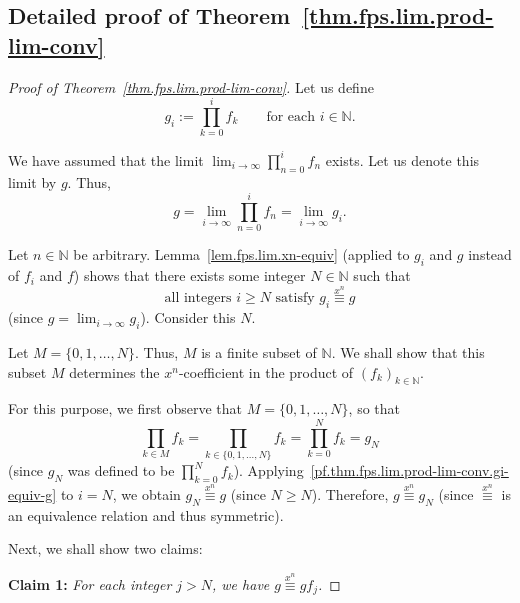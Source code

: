 \subsection{Detailed proof of Theorem~\ref{thm.fps.lim.prod-lim-conv}}

\begin{proof}[Proof of Theorem~\ref{thm.fps.lim.prod-lim-conv}]
\leanok
Let us define
\begin{equation}
g_i := \prod_{k=0}^{i} f_k
\qquad\text{for each } i\in\mathbb{N}.
\label{pf.thm.fps.lim.prod-lim-conv.gi}
\end{equation}

We have assumed that the limit $\lim_{i\to\infty} \prod_{n=0}^{i} f_n$
exists. Let us denote this limit by $g$. Thus,
\begin{equation}
g = \lim_{i\to\infty} \prod_{n=0}^{i} f_n = \lim_{i\to\infty} g_i.
\label{pf.thm.fps.lim.prod-lim-conv.g=lim}
\end{equation}

Let $n\in\mathbb{N}$ be arbitrary.
Lemma~\ref{lem.fps.lim.xn-equiv} (applied to $g_i$ and $g$ instead of
$f_i$ and $f$) shows that there exists some integer $N\in\mathbb{N}$
such that
\begin{equation}
\text{all integers } i\geq N \text{ satisfy }
g_i \overset{x^n}{\equiv} g
\label{pf.thm.fps.lim.prod-lim-conv.gi-equiv-g}
\end{equation}
(since $g = \lim_{i\to\infty} g_i$). Consider this $N$.

Let $M = \{0,1,\ldots,N\}$. Thus, $M$ is a finite subset of
$\mathbb{N}$. We shall show that this subset $M$ determines the
$x^n$-coefficient in the product of $(f_k)_{k\in\mathbb{N}}$.

For this purpose, we first observe that $M = \{0,1,\ldots,N\}$, so that
\begin{equation}
\prod_{k\in M} f_k = \prod_{k\in\{0,1,\ldots,N\}} f_k
= \prod_{k=0}^{N} f_k = g_N
\label{pf.thm.fps.lim.prod-lim-conv.=gN}
\end{equation}
(since $g_N$ was defined to be $\prod_{k=0}^{N} f_k$).
Applying~\eqref{pf.thm.fps.lim.prod-lim-conv.gi-equiv-g} to $i = N$,
we obtain $g_N \overset{x^n}{\equiv} g$ (since $N\geq N$). Therefore,
$g \overset{x^n}{\equiv} g_N$ (since $\overset{x^n}{\equiv}$ is an
equivalence relation and thus symmetric).

Next, we shall show two claims:

\textbf{Claim 1:} \textit{For each integer $j > N$, we have
$g \overset{x^n}{\equiv} g f_j$.}


\end{proof}
